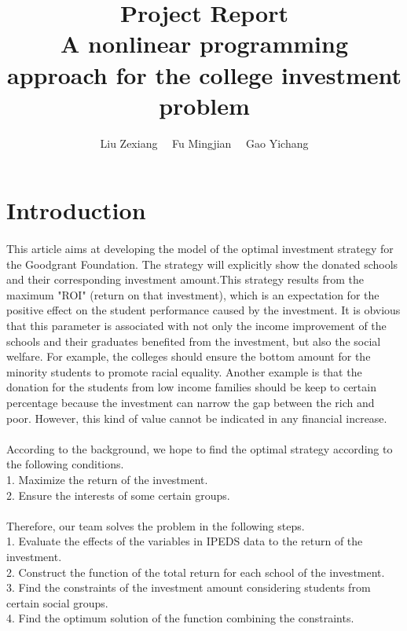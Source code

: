 \documentclass[11pt]{article}
\author{Liu Zexiang \ \ Fu Mingjian \ \ Gao Yichang}
\title{\textbf{Project Report \\[2ex] A nonlinear programming approach for the college investment problem}}
\date{}
\begin{document}
\maketitle  %


\section{Introduction}
\paragraph{} This article aims at developing the model of the optimal investment strategy for the Goodgrant Foundation. The strategy will explicitly show the donated schools and their corresponding investment amount.This strategy results from the maximum "ROI" (return on that investment), which is an expectation for the positive effect on the student performance caused by the investment. It is obvious that this parameter is associated with not only the income improvement of the schools and their graduates benefited from the investment, but also the social welfare. For example, the colleges should ensure the bottom amount for the minority students to promote racial equality. Another example is that the donation for the students from low income families should be keep to certain percentage because the investment can narrow the gap between the rich and poor. However, this kind of value cannot be indicated in any financial increase.
\paragraph{} According to the background, we hope to find the optimal strategy according to the following conditions.
\\ 	1. Maximize the return of the investment.
\\ 	2. Ensure the interests of some certain groups.
\paragraph{} Therefore, our team solves the problem in the following steps.
\\ 	1. Evaluate the effects of the variables in IPEDS data to the return of the investment.
\\  2. Construct the function of the total return for each school of the investment.
\\  3. Find the constraints of the investment amount considering students from certain social groups.
\\  4. Find the optimum solution of the function combining the  constraints.
\end{document}
